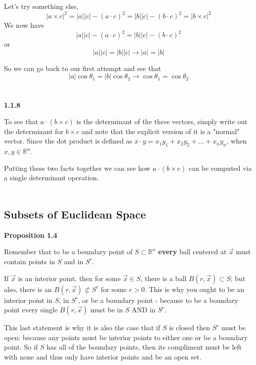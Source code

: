 Let's try something else,
$$
|a\times c|^2 = |a||c| - (a\cdot c)^2
= |b||c| - (b\cdot c)^2 = |b \times c|^2
$$
We now have
$$
|a||c| - (a\cdot c)^2 = |b||c| - (b\cdot c)^2
$$
or
$$
|a||c| = |b||c| \rightarrow |a| = |b|
$$

So we can go back to our first attempt and see that
$$
|a| \cos{\theta_1} = |b| \cos{\theta_2} \rightarrow \cos{\theta_1} = \cos{\theta_2}
$$
\\~\\



\textbf{1.1.8}

To see that $a\cdot(b\times c)$ is the determinant of the three vectors,
simply write out the determinant for $b\times c$ and note that the explicit version of it
is a "normal" vector.
Since the dot product is defined as $x\cdot y = x_1 y_1 + x_2 y_2 + \ldots + x_n y_n$, when
$x, y \in \mathbb{R}^n$.

Putting these two facts together we can see how $a\cdot(b\times c)$ can be computed via a single determinant
operation.
\\~\\



\subsection{Subsets of Euclidean Space}

\textbf{Proposition 1.4}

Remember that to be a boundary point of $S \subset \mathbb{R}^n$ \textbf{every}
ball centered at $\vec{x}$ must contain points in $S$ and in $S^c$.

If $\vec{x}$ is an interior point, then for some $\vec{x} \in S$,
there is a ball $B(r,\vec{x}) \subset S$;
but also, there is an $B(r, \vec{x}) \not\subset S^c$ for some $r>0$.
This is why you ought to be an interior point in $S$, in $S^c$, or be a boundary point
- because to be a boundary point every single $B(r, \vec{x})$ must be in $S$ AND in $S^c$.

This last statement is why it is also the case that if $S$ is closed then $S^c$ must be open:
because any points must be interior points to either one or be a boundary point.
So if $S$ has all of the boundary points, then its compliment must be left with none and thus only
have interior points and be an open set.
\\~\\



